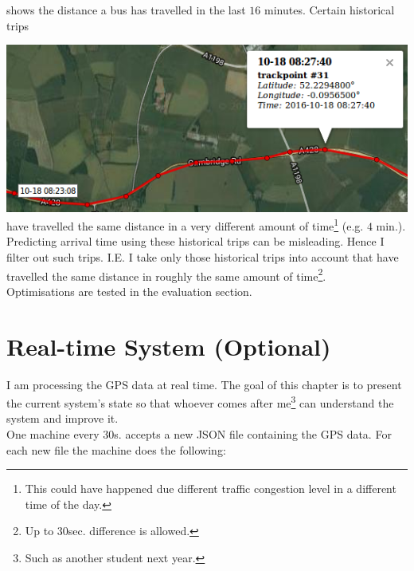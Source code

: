 \documentclass[12pt,a4paper,oneside,openright]{report}
\begin{document}
shows the distance a bus has travelled in the last $16$ minutes. Certain historical
trips

\includegraphics[scale = 0.7]{figs/inaccurate_historical.png} \\

have travelled the same distance in a very different amount of 
time\footnote{This could have happened due different traffic congestion level
in a different time of the day.} (e.g. $4$ min.). Predicting arrival time using
these historical trips can be misleading. Hence I filter out such trips.
I.E. I take only those historical trips into account that have travelled the same
distance in roughly the same amount of time\footnote{Up to 30sec. difference
is allowed.}. \\

Optimisations are tested in the evaluation section.


\newpage

\section{Real-time System (Optional)}

I am processing the GPS data at real time. The goal of this chapter is to present
the current system's state so that whoever comes after
me\footnote{Such as another student next year.} can understand the system and
improve it. \\

One machine every 30s. accepts a new JSON file containing the GPS data. For each new
file the machine does the following:
\end{document}
